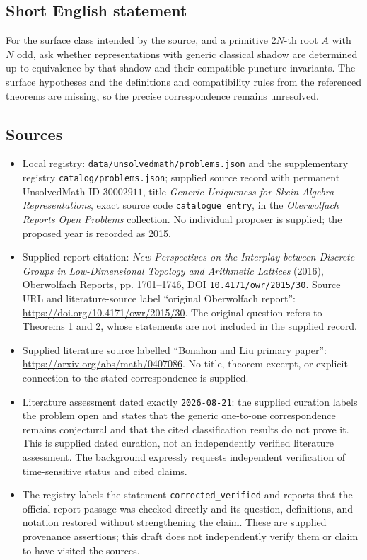 \documentclass[11pt]{article}
\begin{document}
\subsection{Short English statement}
For the surface class intended by the source, and a primitive \(2N\)-th root \(A\) with \(N\) odd, ask whether representations with generic classical shadow are determined up to equivalence by that shadow and their compatible puncture invariants. The surface hypotheses and the definitions and compatibility rules from the referenced theorems are missing, so the precise correspondence remains unresolved.
\subsection{Sources}
\begin{itemize}
\item Local registry: \texttt{data/unsolvedmath/problems.json} and the supplementary registry \texttt{catalog/problems.json}; supplied source record with permanent UnsolvedMath ID \(30002911\), title \emph{Generic Uniqueness for Skein-Algebra Representations}, exact source code \texttt{catalogue entry}, in the \emph{Oberwolfach Reports Open Problems} collection. No individual proposer is supplied; the proposed year is recorded as 2015.
\item Supplied report citation: \emph{New Perspectives on the Interplay between Discrete Groups in Low-Dimensional Topology and Arithmetic Lattices} (2016), Oberwolfach Reports, pp. 1701--1746, DOI \texttt{10.4171/owr/2015/30}. Source URL and literature-source label ``original Oberwolfach report'': \url{https://doi.org/10.4171/owr/2015/30}. The original question refers to Theorems 1 and 2, whose statements are not included in the supplied record.
\item Supplied literature source labelled ``Bonahon and Liu primary paper'': \url{https://arxiv.org/abs/math/0407086}. No title, theorem excerpt, or explicit connection to the stated correspondence is supplied.
\item Literature assessment dated exactly \texttt{2026-08-21}: the supplied curation labels the problem open and states that the generic one-to-one correspondence remains conjectural and that the cited classification results do not prove it. This is supplied dated curation, not an independently verified literature assessment. The background expressly requests independent verification of time-sensitive status and cited claims.
\item The registry labels the statement \texttt{corrected\_verified} and reports that the official report passage was checked directly and its question, definitions, and notation restored without strengthening the claim. These are supplied provenance assertions; this draft does not independently verify them or claim to have visited the sources.
\end{itemize}
\end{document}
